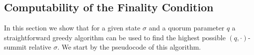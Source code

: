 \documentclass[12pt, fleqn]{article}
\newtheorem{lemma}{Lemma}
\newcommand{\ww}{\mathbb{w}}
\newcommand{\vote}{\mathrm{vote}}
\newcommand{\conf}{\mathrm{conf}}
\newcommand{\damian}[1]{\textcolor{orange}{{\bf Damian:} { #1}}}
\begin{document}







\subsection{Computability of the Finality Condition}
In this section we show that for a given state $\sigma$ and a quorum parameter $q$ a straightforward greedy algorithm can be used to find the highest possible $(q,\cdot)$-summit relative $\sigma$. 
%
We start by the pseudocode of this algorithm.
\end{document}
